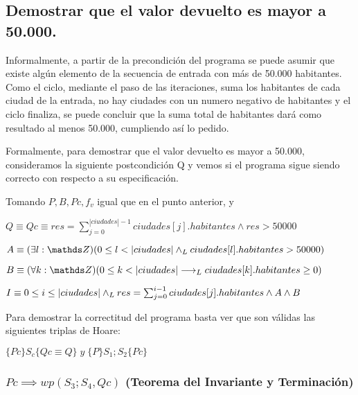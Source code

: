 \documentclass[10pt,a4paper]{article}
\begin{document}
\subsection{Demostrar que el valor devuelto es mayor a 50.000.}
Informalmente, a partir de la precondición del programa se puede asumir que existe algún elemento de la secuencia de entrada con más de 50.000 habitantes. Como el ciclo, mediante el paso de las iteraciones, suma los habitantes de cada ciudad de la entrada, no hay ciudades con un numero negativo de habitantes y el ciclo finaliza, se puede concluir que la suma total de habitantes dará como resultado al menos 50.000, cumpliendo así lo pedido. \par
Formalmente, para demostrar que el valor devuelto es mayor a 50.000, consideramos la siguiente postcondición Q y vemos si el programa sigue siendo correcto con respecto a su especificación.

Tomando $P, B, Pc, f_{v}$ igual que en el punto anterior, y \\ \par
$Q \equiv Qc \equiv res = \sum_{j=0}^{|ciudades|-1} ciudades[j].habitantes \wedge res > 50000$ \\ \par
$A \equiv (\exists l: \ent)(0 \leq l < |ciudades| \yLuego ciudades[l].habitantes > 50000)$\\ \par
$B \equiv (\forall k: \ent)(0 \leq k < |ciudades| \implicaLuego ciudades[k].habitantes \geq 0)$\\ \par
$I \equiv 0 \leq i \leq |ciudades| \land _L res = \sum_{j=0}^{i-1} ciudades[j].habitantes \wedge A \wedge B$\\ \par
Para demostrar la correctitud del programa basta ver que son válidas las siguientes triplas de Hoare: \par
\vspace{5px}

\begin{center}
   ${ \{Pc\} S_{c} \{Qc \equiv{Q}\} \; y \; \{P\} S_{1};S_{2} \{Pc\}}$
\vspace{5px} 
\end{center}


\subsubsection{$Pc \implies wp(S_{3};S_{4},Qc)$ (Teorema del Invariante y Terminación)}
\end{document}
